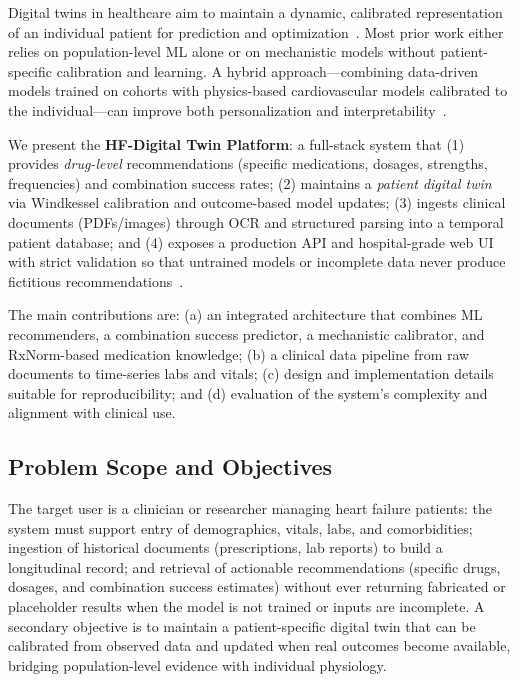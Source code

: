 \documentclass[conference]{IEEEtran}
\begin{document}
Digital twins in healthcare aim to maintain a dynamic, calibrated representation of an individual patient for prediction and optimization~\cite{grieves2014digital,barricelli2019digital}. Most prior work either relies on population-level ML alone or on mechanistic models without patient-specific calibration and learning. A hybrid approach---combining data-driven models trained on cohorts with physics-based cardiovascular models calibrated to the individual---can improve both personalization and interpretability~\cite{topol2019high,rajkomar2019scalable}.

We present the \textbf{HF-Digital Twin Platform}: a full-stack system that (1) provides \emph{drug-level} recommendations (specific medications, dosages, strengths, frequencies) and combination success rates; (2) maintains a \emph{patient digital twin} via Windkessel calibration and outcome-based model updates; (3) ingests clinical documents (PDFs/images) through OCR and structured parsing into a temporal patient database; and (4) exposes a production API and hospital-grade web UI with strict validation so that untrained models or incomplete data never produce fictitious recommendations~\cite{ghassemi2021practical}.

The main contributions are: (a) an integrated architecture that combines ML recommenders, a combination success predictor, a mechanistic calibrator, and RxNorm-based medication knowledge; (b) a clinical data pipeline from raw documents to time-series labs and vitals; (c) design and implementation details suitable for reproducibility; and (d) evaluation of the system's complexity and alignment with clinical use.

\subsection{Problem Scope and Objectives}
The target user is a clinician or researcher managing heart failure patients: the system must support entry of demographics, vitals, labs, and comorbidities; ingestion of historical documents (prescriptions, lab reports) to build a longitudinal record; and retrieval of actionable recommendations (specific drugs, dosages, and combination success estimates) without ever returning fabricated or placeholder results when the model is not trained or inputs are incomplete. A secondary objective is to maintain a patient-specific digital twin that can be calibrated from observed data and updated when real outcomes become available, bridging population-level evidence with individual physiology.
\end{document}
